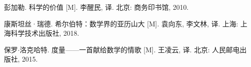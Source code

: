 \documentclass[UTF8]{article}
\begin{document}
\begin{thebibliography}{99}
彭加勒. 科学的价值 [M]. 李醒民, 译. 北京: 商务印书馆, 2010. %

康斯坦丝·瑞德. 希尔伯特：数学界的亚历山大 [M]. 袁向东, 李文林, 译. 上海: 上海科学技术出版社, 2018. %


保罗$\cdot$洛克哈特. 度量——一首献给数学的情歌 [M]. 王凌云, 译. 北京: 人民邮电出版社, 2015. %

\end{thebibliography}

\ifx\wholebook\relax \else

\expandafter\enddocument

\fi
\end{document}
